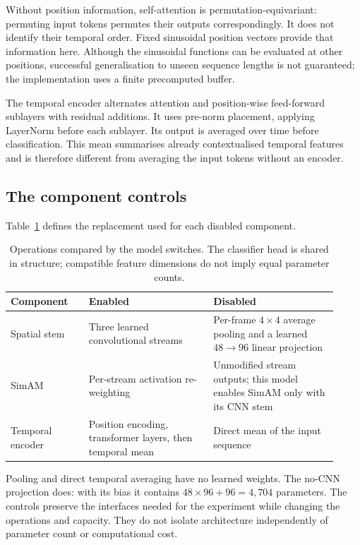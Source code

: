 Without position information, self-attention is permutation-equivariant: permuting input tokens permutes their outputs correspondingly. It does not identify their temporal order. Fixed sinusoidal position vectors provide that information here. Although the sinusoidal functions can be evaluated at other positions, successful generalisation to unseen sequence lengths is not guaranteed; the implementation uses a finite precomputed buffer.

The temporal encoder alternates attention and position-wise feed-forward sublayers with residual additions. It uses pre-norm placement, applying LayerNorm before each sublayer. Its output is averaged over time before classification. This mean summarises already contextualised temporal features and is therefore different from averaging the input tokens without an encoder.

\subsection{The component controls}
\label{sec:fallbacks}

Table~\ref{tab:ch2-component-controls} defines the replacement used for each disabled component.

\begin{table}[htbp]
    \centering
    \small
    \begin{tabular}{@{}p{0.22\linewidth} p{0.35\linewidth} p{0.35\linewidth}@{}}
        \hline
        \textbf{Component} & \textbf{Enabled} & \textbf{Disabled} \\
        \hline
        Spatial stem & Three learned convolutional streams & Per-frame $4\times4$ average pooling and a learned $48\rightarrow96$ linear projection \\
        SimAM & Per-stream activation re-weighting & Unmodified stream outputs; this model enables SimAM only with its CNN stem \\
        Temporal encoder & Position encoding, transformer layers, then temporal mean & Direct mean of the input sequence \\
        \hline
    \end{tabular}
    \caption[Enabled components and their controls]{Operations compared by the model switches. The classifier head is shared in structure; compatible feature dimensions do not imply equal parameter counts.}
    \label{tab:ch2-component-controls}
\end{table}

Pooling and direct temporal averaging have no learned weights. The no-CNN projection does: with its bias it contains $48\times96+96=4{,}704$ parameters. The controls preserve the interfaces needed for the experiment while changing the operations and capacity. They do not isolate architecture independently of parameter count or computational cost.

